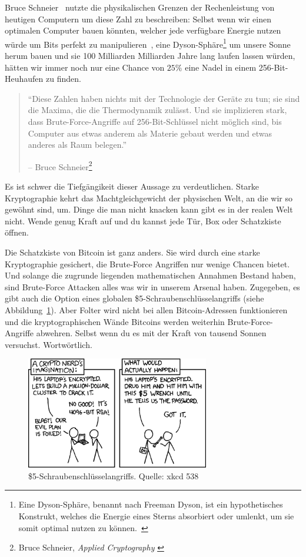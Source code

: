 Bruce Schneier~\cite{web:schneier} nutzte die physikalischen Grenzen der
Rechenleistung von heutigen Computern um diese Zahl zu beschreiben: Selbst wenn
wir einen optimalen Computer bauen könnten, welcher jede verfügbare Energie
nutzen würde um Bits perfekt zu manipulieren~\cite{wiki:landauer}, eine
Dyson-Sphäre\footnote{Eine Dyson-Sphäre, benannt nach Freeman Dyson, ist ein
hypothetisches Konstrukt, welches die Energie eines Sterns absorbiert oder
umlenkt, um sie somit optimal nutzen zu können.~\cite{wiki:dyson}} um unsere
Sonne herum bauen und sie 100 Milliarden Milliarden Jahre lang laufen lassen
würden, hätten wir immer noch nur eine Chance von $25\%$ eine Nadel in einem
256-Bit-Heuhaufen zu finden.

\begin{quotation}\begin{samepage}
\enquote{Diese Zahlen haben nichts mit der Technologie der Geräte zu tun; sie
sind die Maxima, die die Thermodynamik zulässt. Und sie implizieren stark, dass
Brute-Force-Angriffe auf 256-Bit-Schlüssel nicht möglich sind, bis Computer aus
etwas anderem als Materie gebaut werden und etwas anderes als Raum belegen.}
\begin{flushright} -- Bruce Schneier\footnote{Bruce Schneier, \textit{Applied Cryptography} \cite{bruce-schneier}}
\end{flushright}\end{samepage}\end{quotation}

Es ist schwer die Tiefgängikeit dieser Aussage zu verdeutlichen. Starke
Kryptographie kehrt das Machtgleichgewicht der physischen Welt, an die wir so
gewöhnt sind, um. Dinge die man nicht knacken kann gibt es in der realen Welt
nicht. Wende genug Kraft auf und du kannst jede Tür, Box oder Schatzkiste
öffnen.

Die Schatzkiste von Bitcoin ist ganz anders. Sie wird durch eine starke
Kryptographie gesichert, die Brute-Force Angriffen nur wenige Chancen bietet.
Und solange die zugrunde liegenden mathematischen Annahmen Bestand haben, sind
Brute-Force Attacken alles was wir in unserem Arsenal haben. Zugegeben, es gibt
auch die Option eines globalen \$5-Schraubenschlüsselangriffs (siehe
Abbildung~\ref{fig:xkcd-538}). Aber Folter wird nicht bei allen Bitcoin-Adressen
funktionieren und die kryptographischen Wände Bitcoins werden weiterhin
Brute-Force-Angriffe abwehren. Selbst wenn du es mit der Kraft von tausend
Sonnen versuchst. Wortwörtlich.

\begin{figure}
  \centering
  \includegraphics[width=8cm]{assets/images/xkcd-538.png}
  \caption{\$5-Schraubenschlüsselangriffs. Quelle: xkcd 538}
  \label{fig:xkcd-538}
\end{figure}

